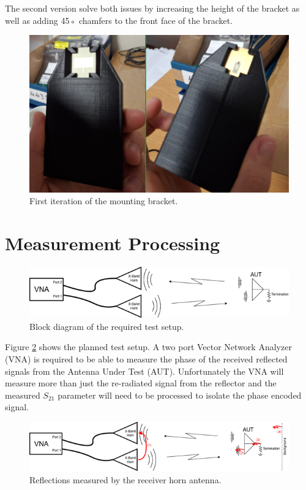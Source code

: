 The second version solve both issues by increasing the height of the bracket as well as adding 45◦ chamfers to the front face of the bracket.

    \begin{figure}[H]
    \centering
    \includegraphics[width=0.4\linewidth]{Figures/chp3_bracket.png}
    \caption{First iteration of the mounting bracket.}
    \label{fig:chp3_bracket}
    \end{figure}

\section{Measurement Processing}

    \begin{figure}[H]
    \centering
    \includegraphics[width=0.8\linewidth]{Figures/chp3_setup.png}
    \caption{Block diagram of the required test setup.}
    \label{fig:chp3_setup}
    \end{figure}

Figure \ref{fig:chp3_setup} shows the planned test setup. A two port Vector Network Analyzer (VNA) is required to be able to measure the phase of the received reflected signals from the Antenna Under Test (AUT). Unfortunately the VNA will measure more than just the re-radiated signal from the reflector and the measured  \(S_{21}\) parameter will need to be processed to isolate the phase encoded signal. 

    \begin{figure}[H]
    \centering
    \includegraphics[width=0.8\linewidth]{Figures/chp3_setup_reflections.png}
    \caption{Reflections measured by the receiver horn antenna.}
    \label{fig:chp3_setup_reflections}
    \end{figure}
    
